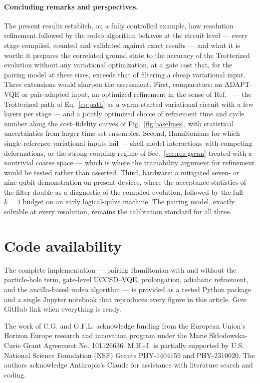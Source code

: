 \documentclass[
  aps,            %
  prc,            %
  reprint,        %
  superscriptaddress,
  floatfix,
  nofootinbib
]{revtex4-2}
\begin{document}
\paragraph{Concluding remarks and perspectives.}
The present results establish, on a fully controlled example, how resolution
refinement followed by the rodeo algorithm behaves at the circuit level ---
every stage compiled, counted and validated against exact results --- and
what it is worth: it prepares the correlated ground state to the accuracy of
the Trotterized evolution without any variational optimization, at a gate
cost that, for the pairing model at these sizes, exceeds that of filtering a
cheap variational input.  Three extensions would sharpen the assessment.
First, comparators: an ADAPT-VQE or pair-adapted input, an optimized
refinement in the sense of Ref.~\cite{Sadia2026} --- the Trotterized path of
Eq.~\eqref{eq:path} as a warm-started variational circuit with a few layers
per stage --- and a jointly optimized choice of refinement time and cycle
number along the cost--fidelity curves of Fig.~\ref{fig:baselines}, with
statistical uncertainties from larger time-set ensembles.  Second, Hamiltonians for which single-reference
variational inputs fail --- shell-model interactions with competing
deformations, or the strong-coupling regime of Sec.~\ref{sec:res-gscan}
treated with a nontrivial coarse space --- which is where the trainability
argument for refinement would be tested rather than asserted.  Third,
hardware: a mitigated seven- or nine-qubit demonstration on present devices,
where the acceptance statistics of the filter double as a diagnostic of the
compiled evolution, followed by the full $k=4$ budget on an early
logical-qubit machine.  The pairing model, exactly solvable at every
resolution, remains the calibration standard for all three.

\section*{Code availability}
The complete implementation --- pairing Hamiltonian with and without the
particle-hole term, gate-level UCCSD--VQE, prolongation, adiabatic refinement,
and the ancilla-based rodeo algorithm --- is provided as a tested Python package
and a single Jupyter notebook that reproduces every figure in this article.
Give GitHub link when everything is ready.
\begin{acknowledgments}
The work of C.G. and G.F.L. acknowledge funding from the
European Union’s Horizon Europe research and innovation program under the Marie Skłodowska-Curie Grant Agreement No.
101126636. M.H.-J. is partially supported by U.S. National Science Foundation
(NSF) Grants PHY-1404159 and PHY-2310020. 
The authors  acknowledge Anthropic’s Claude
for assistance with literature search and coding.

\end{acknowledgments}
\end{document}
